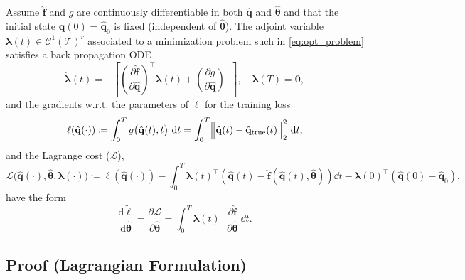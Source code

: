 \begin{theorem}
    \label{thm:adjoint_method}
    Assume $\hat{\mathbf{f}}$ and $g$ are continuously differentiable in both $\hat{\mathbf{q}}$ and $\hat{\bm{\theta}}$ and that the initial state $\hat{\mathbf{q}}(0)=\hat{\mathbf{q}}_0$ is fixed (independent of $\hat{\bm{\theta}}$). The adjoint variable $\bm{\lambda}(t)\in\mathcal{C}^1(\mathcal{T})^r$ associated to a minimization problem such in \eqref{eq:opt_problem} satisfies a back propagation ODE\\ 
    \begin{equation}
        \dot{\bm{\lambda}}(t) = -\left[ \left(\dfrac{\partial \hat{\mathbf{f}}}{\partial\hat{\mathbf{q}}}\right)^{\top}\bm{\lambda}(t) + \left( \dfrac{\partial g}{\partial \hat{\mathbf{q}}} \right)^{\top} \right],\quad\bm{\lambda}(T)=\bm{0},
        \label{eq:adjoint_eqs}
    \end{equation}
    and the gradients w.r.t. the parameters of $\tilde\ell$ for the training loss\\
    \begin{equation*}
        \ell(\hat{\mathbf{q}}(\cdot)) \coloneqq \displaystyle\int_0^T g\bigl(\hat{\mathbf{q}}(t),t\bigr)~\dd t = \int_0^T \Bigl\|\hat{\mathbf{q}}(t) - \hat{\mathbf{q}}_{\mathrm{true}}(t)\Bigr\|_2^2~\dd t,
    \end{equation*}
    and the Lagrange cost ($\mathscr{L}$),\\
    \begin{equation*}
        \mathscr{L}\bigl(\hat{\mathbf{q}}(\cdot),\hat{\bm{\theta}},\bm{\lambda}(\cdot)\bigr) \coloneqq \ell(\hat{\mathbf{q}}(\cdot)) - \int_0^T \bm{\lambda}(t)^{\top}\left( \dot{\hat{\mathbf{q}}}(t)-\hat{\mathbf{f}}(\hat{\mathbf{q}}(t),\hat{\bm{\theta}}) \right)\dd t - \bm{\lambda}(0)^{\top}(\hat{\mathbf{q}}(0)-\hat{\mathbf{q}}_0),
        \label{eq:lagrange_cost2}
    \end{equation*}
    have the form\\
    \begin{equation}
        \dfrac{\mathrm{d} \tilde{\ell}}{\mathrm{d} \hat{\bm{\theta}}} = \dfrac{\partial \mathscr{L}}{\partial\hat{\bm{\theta}}} = \int_0^T \bm{\lambda}(t)^{\top}\dfrac{\partial\hat{\mathbf{f}}}{\partial\hat{\bm{\theta}}}~\dd t.
        \label{eq:gradient_lagrange}
    \end{equation}
\end{theorem}

\subsection*{Proof (Lagrangian Formulation)}

